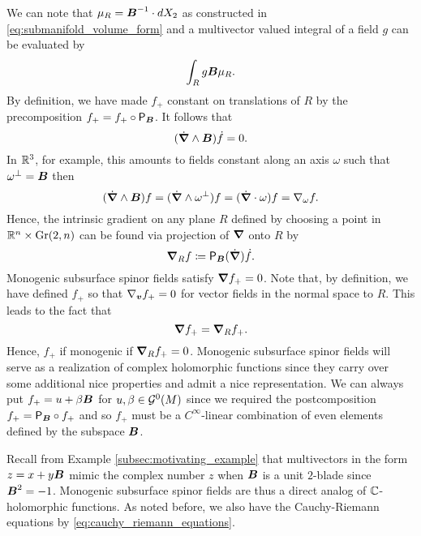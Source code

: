 We can note that $\mu_R = \boldsymbol{B}^{-1} \cdot dX_2$ as constructed in \cref{eq:submanifold_volume_form} and a multivector valued integral of a field $g$ can be evaluated by
\begin{equation}
\int_R g\boldsymbol{B}\mu_R.
\end{equation}
By definition, we have made $f_+$ constant on translations of $R$ by the precomposition $f_+ = f_+ \circ \mathsf{P}_{\boldsymbol{B}}$. It follows that 
\begin{equation}
\label{eq:exterior_b_derivative}
(\dot{\boldsymbol{\nabla}} \wedge \boldsymbol{B})\dot{f} = 0.
\end{equation}
In $\mathbb{R}^3$, for example, this amounts to fields constant along an axis $\omega$ such that $\omega^\perp = \boldsymbol{B}$ then
\begin{equation}
\label{eq:omega_axial_equivalence}
(\dot{\boldsymbol{\nabla}} \wedge \boldsymbol{B})f = (\dot{\boldsymbol{\nabla}} \wedge \omega^\perp)f  =(\dot{\boldsymbol{\nabla}} \cdot \omega)f = \nabla_\omega f.
\end{equation} 
Hence, the intrinsic gradient on any plane $R$ defined by choosing a point in $\mathbb{R}^n \times \operatorname{Gr}(2,n)$ can be found via projection of $\boldsymbol{\nabla}$ onto $R$ by 
\begin{equation}
\boldsymbol{\nabla}_R f \coloneqq \mathsf{P}_{\boldsymbol{B}} (\dot{\boldsymbol{\nabla}})\dot{f}.
\end{equation} 
Monogenic subsurface spinor fields satisfy $\boldsymbol{\nabla} f_+ = 0$. Note that, by definition, we have defined $f_+$ so that $\nabla_{\boldsymbol{v}} f_+ =0$ for vector fields in the normal space to $R$. This leads to the fact that
\begin{equation}
\boldsymbol{\nabla} f_+ = \boldsymbol{\nabla}_R f_+.
\end{equation}
Hence, $f_+$ if monogenic if $\boldsymbol{\nabla}_R f_+ =0$.  Monogenic subsurface spinor fields will serve as a realization of complex holomorphic functions since they carry over some additional nice properties and admit a nice representation. We can always put $f_+=u+\beta \boldsymbol{B}$ for $u,\beta \in \mathcal{G}^0(M)$ since we required the postcomposition $f_+=\mathsf{P}_{\boldsymbol{B}} \circ f_+$ and so $f_+$ must be a $C^\infty$-linear combination of even elements defined by the subspace $\boldsymbol{B}$.  

Recall from Example \ref{subsec:motivating_example} that multivectors in the form $z=x+y\boldsymbol{B}$ mimic the complex number $z$ when $\boldsymbol{B}$ is a unit $2$-blade since $\boldsymbol{B}^2=-1$.  Monogenic subsurface spinor fields are thus a direct analog of $\mathbb{C}$-holomorphic functions.  As noted before, we also have the Cauchy-Riemann equations by \cref{eq:cauchy_riemann_equations}.

